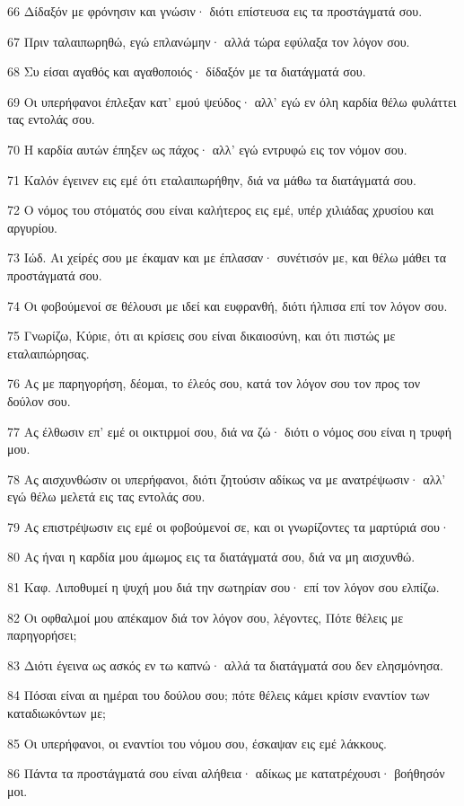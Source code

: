 \par 66 Δίδαξόν με φρόνησιν και γνώσιν· διότι επίστευσα εις τα προστάγματά σου.
\par 67 Πριν ταλαιπωρηθώ, εγώ επλανώμην· αλλά τώρα εφύλαξα τον λόγον σου.
\par 68 Συ είσαι αγαθός και αγαθοποιός· δίδαξόν με τα διατάγματά σου.
\par 69 Οι υπερήφανοι έπλεξαν κατ' εμού ψεύδος· αλλ' εγώ εν όλη καρδία θέλω φυλάττει τας εντολάς σου.
\par 70 Η καρδία αυτών έπηξεν ως πάχος· αλλ' εγώ εντρυφώ εις τον νόμον σου.
\par 71 Καλόν έγεινεν εις εμέ ότι εταλαιπωρήθην, διά να μάθω τα διατάγματά σου.
\par 72 Ο νόμος του στόματός σου είναι καλήτερος εις εμέ, υπέρ χιλιάδας χρυσίου και αργυρίου.
\par 73 Ιώδ. Αι χείρές σου με έκαμαν και με έπλασαν· συνέτισόν με, και θέλω μάθει τα προστάγματά σου.
\par 74 Οι φοβούμενοί σε θέλουσι με ιδεί και ευφρανθή, διότι ήλπισα επί τον λόγον σου.
\par 75 Γνωρίζω, Κύριε, ότι αι κρίσεις σου είναι δικαιοσύνη, και ότι πιστώς με εταλαιπώρησας.
\par 76 Ας με παρηγορήση, δέομαι, το έλεός σου, κατά τον λόγον σου τον προς τον δούλον σου.
\par 77 Ας έλθωσιν επ' εμέ οι οικτιρμοί σου, διά να ζώ· διότι ο νόμος σου είναι η τρυφή μου.
\par 78 Ας αισχυνθώσιν οι υπερήφανοι, διότι ζητούσιν αδίκως να με ανατρέψωσιν· αλλ' εγώ θέλω μελετά εις τας εντολάς σου.
\par 79 Ας επιστρέψωσιν εις εμέ οι φοβούμενοί σε, και οι γνωρίζοντες τα μαρτύριά σου·
\par 80 Ας ήναι η καρδία μου άμωμος εις τα διατάγματά σου, διά να μη αισχυνθώ.
\par 81 Καφ. Λιποθυμεί η ψυχή μου διά την σωτηρίαν σου· επί τον λόγον σου ελπίζω.
\par 82 Οι οφθαλμοί μου απέκαμον διά τον λόγον σου, λέγοντες, Πότε θέλεις με παρηγορήσει;
\par 83 Διότι έγεινα ως ασκός εν τω καπνώ· αλλά τα διατάγματά σου δεν ελησμόνησα.
\par 84 Πόσαι είναι αι ημέραι του δούλου σου; πότε θέλεις κάμει κρίσιν εναντίον των καταδιωκόντων με;
\par 85 Οι υπερήφανοι, οι εναντίοι του νόμου σου, έσκαψαν εις εμέ λάκκους.
\par 86 Πάντα τα προστάγματά σου είναι αλήθεια· αδίκως με κατατρέχουσι· βοήθησόν μοι.
